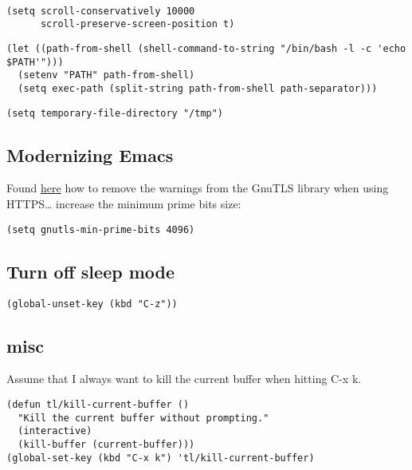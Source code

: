 \documentclass[12pt]{article}
\begin{document}
\lstset{language=Lisp,label= ,caption= ,captionpos=b,numbers=none}
\begin{lstlisting}

(setq scroll-conservatively 10000
      scroll-preserve-screen-position t)

\end{lstlisting}


\lstset{language=Lisp,label= ,caption= ,captionpos=b,numbers=none}
\begin{lstlisting}
(let ((path-from-shell (shell-command-to-string "/bin/bash -l -c 'echo $PATH'")))
  (setenv "PATH" path-from-shell)
  (setq exec-path (split-string path-from-shell path-separator)))

\end{lstlisting}

\lstset{language=Lisp,label= ,caption= ,captionpos=b,numbers=none}
\begin{lstlisting}
(setq temporary-file-directory "/tmp")
\end{lstlisting}

\subsection{Modernizing Emacs}
\label{sec:orgb6c20d0}

Found \href{https://github.com/wasamasa/dotemacs/blob/master/init.org\#init}{here} how to remove the warnings from the GnuTLS library when
using HTTPS\ldots{} increase the minimum prime bits size:
\lstset{language=Lisp,label= ,caption= ,captionpos=b,numbers=none}
\begin{lstlisting}
(setq gnutls-min-prime-bits 4096)
\end{lstlisting}

\subsection{Turn off sleep mode}
\label{sec:org4c302f8}

\lstset{language=Lisp,label= ,caption= ,captionpos=b,numbers=none}
\begin{lstlisting}
(global-unset-key (kbd "C-z"))
\end{lstlisting}
\subsection{misc}
\label{sec:orgdc34a9d}
Assume that I always want to kill the current buffer when hitting C-x k.
\lstset{language=Lisp,label= ,caption= ,captionpos=b,numbers=none}
\begin{lstlisting}
(defun tl/kill-current-buffer ()
  "Kill the current buffer without prompting."
  (interactive)
  (kill-buffer (current-buffer)))
(global-set-key (kbd "C-x k") 'tl/kill-current-buffer)
\end{lstlisting}
\end{document}
